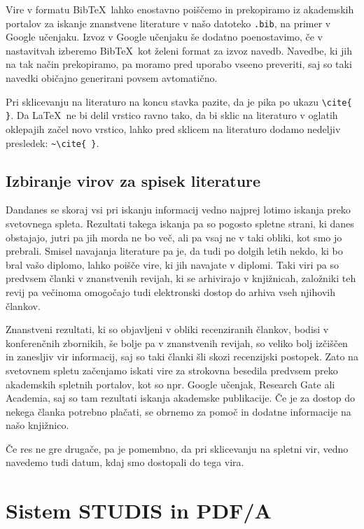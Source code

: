 \documentclass[a4paper, 12pt]{book}
\newcommand{\BibTeX}{{\sc Bib}\TeX}
\begin{document}
{{Vire v formatu \BibTeX\ lahko enostavno poiščemo in prekopiramo iz akademskih portalov za iskanje znanstvene literature v našo datoteko \texttt{.bib}, na primer v Google učenjaku.
Izvoz v Google učenjaku še dodatno poenostavimo, če v nastavitvah izberemo \BibTeX\ kot želeni format za izvoz navedb.
Navedbe, ki jih na tak način prekopiramo, pa moramo pred uporabo vseeno preveriti, saj so taki navedki običajno generirani povsem avtomatično.

Pri sklicevanju na literaturo na koncu stavka pazite, da je pika po ukazu \verb=\cite{ }=.
Da \LaTeX\ ne bi delil vrstico ravno tako, da bi sklic na literaturo v oglatih oklepajih začel novo vrstico, lahko pred sklicem na literaturo dodamo nedeljiv presledek: \verb=~\cite{ }=.


\section{Izbiranje virov za spisek literature}

Dandanes  se skoraj  vsi pri iskanju informacij vedno najprej lotimo iskanja preko svetovnega spleta.
Rezultati takega iskanja pa so pogosto spletne strani, ki danes obstajajo, jutri pa jih morda ne bo več, ali pa vsaj ne v taki obliki, kot smo jo prebrali.
Smisel navajanja literature pa je, da tudi po dolgih letih nekdo, ki bo bral vašo diplomo, lahko poišče vire, ki jih navajate v diplomi.
Taki viri pa so predvsem članki v znanstvenih revijah, ki se arhivirajo v knjižnicah, založniki teh revij pa večinoma omogočajo tudi elektronski dostop do arhiva vseh njihovih člankov.

Znanstveni rezultati, ki so objavljeni v obliki recenziranih člankov, bodisi v konferenčnih zbornikih, še bolje pa v znanstvenih revijah, so veliko bolj izčiščen in zanesljiv vir informacij, saj
so taki članki šli skozi recenzijski postopek.
Zato na svetovnem spletu začenjamo iskati vire za strokovna besedila predvsem preko akademskih spletnih portalov, kot so npr. Google učenjak, Research Gate ali Academia, saj
 so tam rezultati iskanja akademske publikacije.
Če je za dostop do nekega članka potrebno plačati, se obrnemo za pomoč in dodatne informacije na  našo knjižnico.

Če res ne gre drugače, pa je pomembno, da pri sklicevanju na spletni vir, vedno navedemo tudi datum, kdaj smo dostopali do tega vira.



\chapter{Sistem STUDIS in PDF/A}
\label{PDF}

}}
\end{document}
